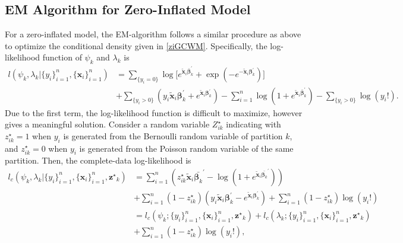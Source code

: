\documentclass[12pt,letterpaper]{article}
\numberwithin{equation}{section}
\numberwithin{equation}{section}
\numberwithin{equation}{section}
\newcommand{\xTilda}{\tilde{\bm{x}}}
\newcommand{\zZ}{Z^\star}
\newcommand{\zz}{z^\star}
\begin{document}

\subsection{EM Algorithm for Zero-Inflated Model} 
For a zero-inflated model, the EM-algorithm follows a similar procedure as above to optimize the conditional density given in \eqref{ziGCWM}.  Specifically, the log-likelihood function of $\psi_k$ and $\lambda_k$ is 
\begin{equation*}\begin{split}
l(\psi_k,\lambda_k| \{y_i\}_{i=1}^n,\{\bm{x}_i\}_{i=1}^n) &= \sum_{\{y_i = 0\}} \log \big[ e^{ \bm{ \xTilda}_i \bm{\bar{\beta}}_k^{'}  } + \exp{( - e^ { -\bm{\xTilda}_i \bm{\beta}_k^{'} })} \big]  \\ & +  \sum_{\{y_i > 0\}} \left( y_i \xTilda_i \bm{\beta}_k^{'} + e^{ \xTilda_i \bm{\beta}_k^{'} } \right)  - \sum_{i=1}^n  \log \left(1 + e^ {\xTilda_i \bm{\bar{\beta}}_k^{'} } \right) - \sum_{\{y_i > 0\}} \log(y_i ! ).
\end{split}\end{equation*}
Due to the first term, the log-likelihood function is difficult to maximize, however \cite{Lambert} gives a meaningful solution.  Consider a random variable $\zZ_{ik}$ indicating with ${\zz_{ik}} = 1$ when $y_i$ is generated from the Bernoulli random variable of partition $k$, and $\zz_{ik} = 0$ when $y_i$ is generated from the Poisson random variable of the same partition.  Then, the complete-data log-likelihood is 
\begin{align*}
l_c(\psi_k,\lambda_k| \{y_i\}_{i=1}^n,\{\bm{x}_i\}_{i=1}^n,{\bm{\zz}_k}) &= \sum_{i=1}^n \left( \zz_{ik}\xTilda_i \bar{\bm{\beta}_k }^{'} - \log\left(1+ e^{ \xTilda_i \bar{\bm{\beta}_k }^{'}}\right) \right)  \\ & + \sum_{i=1}^n (1-\zz_{ik}) (y_i \xTilda_i \bm{\beta}_k^{'}  - e^{\xTilda_i \bm{\beta}_k^{'}})+ \sum_{i=1}^n (1-\zz_{ik})\log(y_i!)\\
&= l_c(\psi_k;\{y_i\}_{i=1}^n,\{\bm{x}_i\}_{i=1}^n,{{\bm{\zz}_k}}) + l_c(\lambda_k; \{y_i\}_{i=1}^n,\{\bm{x}_i\}_{i=1}^n,{{\bm{\zz}_k}}) \\
&+ \sum_{i=1}^n (1- \zz_{ik})\log(y_i!), %
\end{align*}
\end{document}
